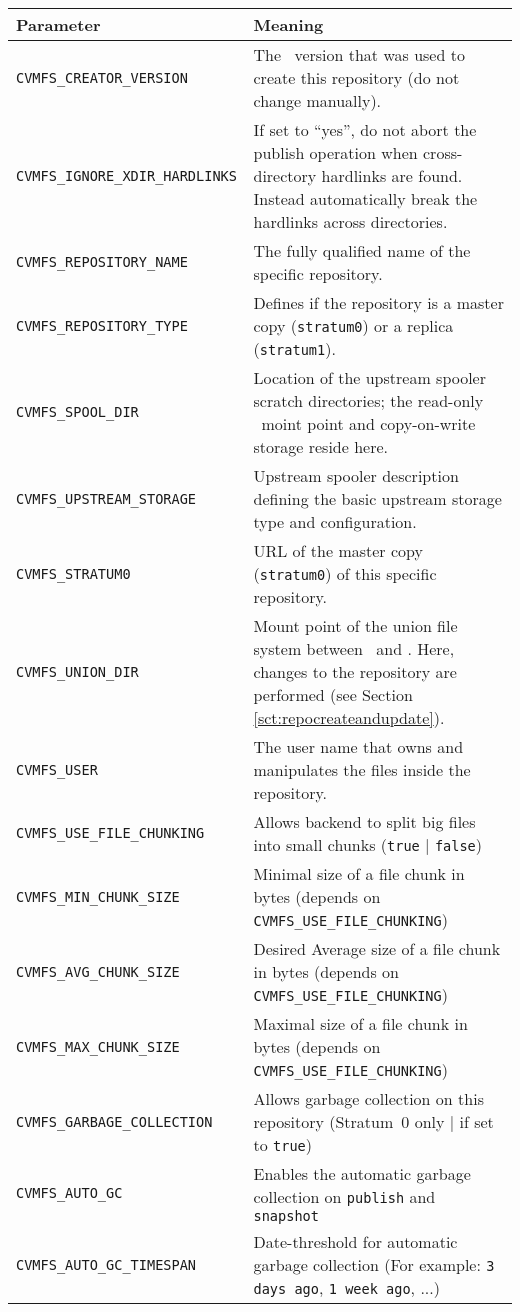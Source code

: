 	\begin{longtable}{lX}
		\toprule
		{\bf\centering Parameter} 			& {\bf\centering Meaning}\\
		\midrule
		\tt CVMFS\_CREATOR\_VERSION			& The \cvmfs\ version that was used to create this repository (do not change manually).\\
		\tt CVMFS\_IGNORE\_XDIR\_HARDLINKS		& If set to ``yes'', do not abort the publish operation when cross-directory hardlinks are found.  Instead automatically break the hardlinks across directories.\\
		\tt CVMFS\_REPOSITORY\_NAME			& The fully qualified name of the specific repository.\\
		\tt CVMFS\_REPOSITORY\_TYPE			& Defines if the repository is a master copy (\texttt{stratum0}) or a replica (\texttt{stratum1}).\\
		\tt CVMFS\_SPOOL\_DIR					& Location of the upstream spooler scratch directories; the read-only \cvmfs\ moint point and copy-on-write storage reside here.\\
		\tt CVMFS\_UPSTREAM\_STORAGE			& Upstream spooler description defining the basic upstream storage type and configuration.\\
		\tt CVMFS\_STRATUM0					& URL of the master copy (\texttt{stratum0}) of this specific repository.\\
		\tt CVMFS\_UNION\_DIR					& Mount point of the union file system between \cvmfs\ and \aufs. Here, changes to the repository are performed (see Section \ref{sct:repocreateandupdate}).\\
		\tt CVMFS\_USER						& The user name that owns and manipulates the files inside the repository.\\
		\tt CVMFS\_USE\_FILE\_CHUNKING		& Allows backend to split big files into small chunks (\texttt{true} | \texttt{false})\\
		\tt CVMFS\_MIN\_CHUNK\_SIZE			& Minimal size of a file chunk in bytes \newline (depends on \texttt{CVMFS\_USE\_FILE\_CHUNKING})\\
		\tt CVMFS\_AVG\_CHUNK\_SIZE			& Desired Average size of a file chunk in bytes \newline (depends on \texttt{CVMFS\_USE\_FILE\_CHUNKING})\\
		\tt CVMFS\_MAX\_CHUNK\_SIZE			& Maximal size of a file chunk in bytes \newline (depends on \texttt{CVMFS\_USE\_FILE\_CHUNKING})\\
		\tt CVMFS\_GARBAGE\_COLLECTION			& Allows garbage collection on this repository \newline (Stratum~0 only | if set to \texttt{true})\\
		\tt CVMFS\_AUTO\_GC			& Enables the automatic garbage collection on \texttt{publish} and \texttt{snapshot}\\
		\tt CVMFS\_AUTO\_GC\_TIMESPAN			& Date-threshold for automatic garbage collection \newline (For example: \texttt{3 days ago}, \texttt{1 week ago}, ...)\\
		\bottomrule
	\end{longtable}
